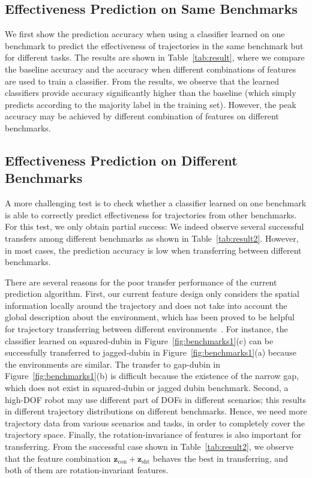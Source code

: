 \documentclass[letterpaper, 10 pt, conference]{ieeeconf}  %
\newcommand{\fcon}{\mbox{$\mathbf z_{\text{con}}$}}
\newcommand{\fsht}{\mbox{$\mathbf z_{\text{sht}}$}}
\begin{document}
\subsection{Effectiveness Prediction on Same Benchmarks}
We first show the prediction accuracy when using a classifier learned on one benchmark to predict the effectiveness of trajectories in the same benchmark but for different tasks. The results are shown in Table~\ref{tab:result}, where we compare the baseline accuracy and the accuracy when different combinations of features are used to train a classifier. From the results, we observe that the learned classifiers provide accuracy significantly higher than the baseline (which simply predicts according to the majority label in the training set). However, the peak accuracy may be achieved by different combination of features on different benchmarks.

\subsection{Effectiveness Prediction on Different Benchmarks}
A more challenging test is to check whether a classifier learned on one benchmark is able to correctly predict effectiveness for trajectories from other benchmarks. For this test, we only obtain partial success: We indeed observe several successful transfers among different benchmarks as shown in Table~\ref{tab:result2}. However, in most cases, the prediction accuracy is low when transferring between different benchmarks.

There are several reasons for the poor transfer performance of the current prediction algorithm. First, our current feature design only considers the spatial information locally around the trajectory and does not take into account the global description about the environment, which has been proved to be helpful for trajectory transferring between different environments~\cite{Jetchev:2013:FMP}. For instance, the classifier learned on squared-dubin in Figure~\ref{fig:benchmarks1}(c) can be successfully transferred to jagged-dubin in Figure~\ref{fig:benchmarks1}(a) because the environments are similar. The transfer to gap-dubin in Figure~\ref{fig:benchmarks1}(b) is difficult because the existence of the narrow gap, which does not exist in squared-dubin or jagged dubin benchmark. Second, a high-DOF robot may use different part of DOFs in different scenarios; this results in different trajectory distributions on different benchmarks. Hence, we need more trajectory data from various scenarios and tasks, in order to completely cover the trajectory space. Finally, the rotation-invariance of features is also important for transferring. From the successful case shown in Table~\ref{tab:result2}, we observe that the feature combination $\fcon+\fsht$ behaves the best in transferring, and both of them are rotation-invariant features. 
\end{document}
